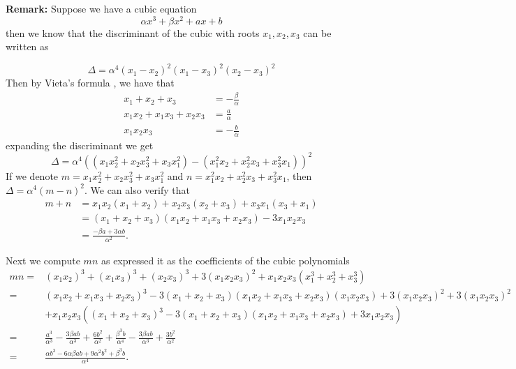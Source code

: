 \documentclass[a4 paper]{article}
\newcommand{\?}{\stackrel{?}{=}}
\begin{document}
\begin{note}{\bcicosaedre}
\textbf{Remark:} \cite[]{discriminant} Suppose we have a cubic equation 
$$ \alpha x^3 +  \beta x^2 + ax  +b   $$
then we know that the discriminant of the cubic with roots $ x_1 , x_2 , x_3  $ can be written as 

$$ \Delta = \alpha^4(x_1 - x_2  )^2 (x_1 - x_3 )^2 (x_2 - x_3 )^2 $$
Then by Vieta's formula \cite{enwiki:1154999372}, we have that 
\begin{align*}
    x_1 + x_2 + x_3 & = - \frac{\beta}{\alpha} \\ 
    x_1 x_2 + x_1 x_3 + x_2 x_3 & = \frac{a}{\alpha} \\ 
    x_1 x_2 x_3 & = - \frac{b}{\alpha}
\end{align*}
expanding the discriminant we get 
$$ \Delta = \alpha^4 ((x_1 x_2 ^2 + x_2 x_3 ^2 + x_3 x_1 ^2) - (x_1 ^2 x_2 + x_2 ^2 x_3 + x_3 ^2 x_1 ))^2 $$
If we denote $ m = x_1 x_2 ^2 + x_2 x_3 ^2 + x_3 x_1 ^2 $ and $ n = x_1 ^2 x_2  +x_2 ^2 x_3 + x_3 ^2 x_1  $, then $ \Delta = \alpha^4(m-n)^2 $. We can also verify that 
\begin{align*}
m+n & =x_1 x_2\left(x_1+x_2\right)+x_2 x_3\left(x_2+x_3\right)+x_3 x_1\left(x_3+x_1\right) \\
& =\left(x_1+x_2+x_3\right)\left(x_1 x_2+x_1 x_3+x_2 x_3\right)-3 x_1 x_2 x_3 \\
& =\frac{- \beta a +3 \alpha b}{\alpha^2} .
\end{align*}

Next we compute $ mn $ as expressed it as the coefficients of the cubic polynomials 
\begin{align*}
    m n= & \left(x_1 x_2\right)^3+\left(x_1 x_3\right)^3+\left(x_2 x_3\right)^3+3\left(x_1 x_2 x_3\right)^2+x_1 x_2 x_3\left(x_1^3+x_2^3+x_3^3\right) \\
    = & \left(x_1 x_2+x_1 x_3+x_2 x_3\right)^3-3\left(x_1+x_2+x_3\right)\left(x_1 x_2+x_1 x_3+x_2 x_3\right)\left(x_1 x_2 x_3\right)+3\left(x_1 x_2 x_3\right)^2+3\left(x_1 x_2 x_3\right)^2 \\
    & +x_1 x_2 x_3\left(\left(x_1+x_2+x_3\right)^3-3\left(x_1+x_2+x_3\right)\left(x_1 x_2+x_1 x_3+x_2 x_3\right)+3 x_1 x_2 x_3\right) \\
    = & \frac{a^3}{\alpha^3}-\frac{3\beta a b}{\alpha^3}+\frac{6 b^2}{\alpha^2}+\frac{\beta^3 b}{\alpha^4}-\frac{3 \beta a b}{\alpha^3}+\frac{3 b^2}{\alpha^2} \\
    = & \frac{\alpha b^3-6 \alpha \beta a b+9 \alpha^2 b^2+\beta^3 b}{\alpha^4} .
    \end{align*}


\end{note}
\end{document}
